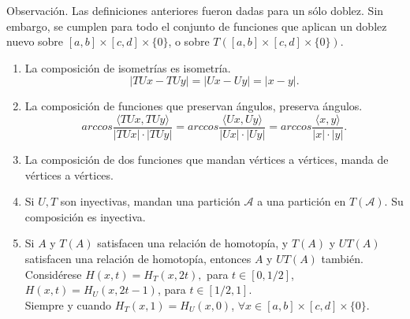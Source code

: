 \documentclass{beamer}
\begin{document}
\begin{frame}[t]
	\begin{block}{Observación.}
		Las definiciones anteriores fueron dadas para un sólo doblez.
		Sin embargo, se cumplen para todo el conjunto de funciones que aplican un doblez nuevo sobre \([a,b] \times [c,d] \times \{0\}\),
		o sobre \(T([a,b] \times [c,d] \times \{0\})\).
		\begin{enumerate}
			\item La composición de isometrías es isometría.
				\[
					\big| TUx - TUy \big| = \big| Ux - Uy \big| = |x-y|.
				\]
			\item La composición de funciones que preservan ángulos, preserva ángulos.
				\[
					arccos \dfrac{\langle TUx,TUy \rangle}{|TUx| \cdot |TUy|} = arccos \dfrac{\langle Ux,Uy \rangle}{|Ux| \cdot |Uy|} = arccos \dfrac{\langle x,y \rangle}{|x| \cdot |y|}.
				\]
			\item La composición de dos funciones que mandan vértices a vértices, manda de vértices a vértices.
			\item Si \(U,T\) son inyectivas, mandan una partición \(\mathscr{A}\) a una partición en \(T(\mathscr{A})\). Su composición es inyectiva.
		\end{enumerate}
	\end{block}
	\vspace{2mm}
\end{frame}

\begin{frame}[t]
	\begin{exampleblock}{}
		\begin{enumerate}
				\setcounter{enumi}{4}
			\item Si \(A\) y \(T(A)\) satisfacen una relación de homotopía, y \(T(A)\) y \(UT(A)\) satisfacen una relación de homotopía, entonces \(A\) y \(UT(A)\) también.
				Considérese \(H(x,t) = H_T(x,2t),\) para \(t \in [0,1/2]\), \(H(x,t) = H_U(x,2t-1)\), para \(t \in [1/2,1]\). \\[2mm]
				Siempre y cuando \(H_T(x,1) = H_U(x,0)\), \(\forall x \in [a,b] \times [c,d] \times \{0\}\).
		\end{enumerate}
	\end{exampleblock}
	\vspace{2mm}
\end{frame}
\end{document}
